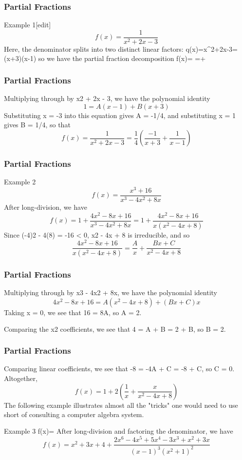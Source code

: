\begin{frame}
\frametitle{Partial Fractions}

Example 1[edit]
\[ f(x)=\frac{1}{x^2+2x-3} \]
Here, the denominator splits into two distinct linear factors:
q(x)=x^2+2x-3=(x+3)(x-1)
so we have the partial fraction decomposition
f(x)= =+
\end{frame}
\begin{frame}
\frametitle{Partial Fractions}
Multiplying through by x2 + 2x - 3, we have the polynomial identity
\[ 1=A(x-1)+B(x+3) \]
Substituting x = -3 into this equation gives A = -1/4, and substituting x = 1 gives B = 1/4, so that
\[f(x) =\frac{1}{x^2+2x-3} =\frac{1}{4}\left(\frac{-1}{x+3}+\frac{1}{x-1}\right) \]
\end{frame}
\begin{frame}
\frametitle{Partial Fractions}

Example 2
\[f(x)=\frac{x^3+16}{x^3-4x^2+8x}\]
After long-division, we have
\[ f(x)=1+\frac{4x^2-8x+16}{x^3-4x^2+8x}=1+\frac{4x^2-8x+16}{x(x^2-4x+8)} \]
Since (-4)2 - 4(8) = -16 < 0, x2 - 4x + 8 is irreducible, and so
\[ \frac{4x^2-8x+16}{x(x^2-4x+8)}=\frac{A}{x}+\frac{Bx+C}{x^2-4x+8} \]
\end{frame}
\begin{frame}
\frametitle{Partial Fractions}
Multiplying through by x3 - 4x2 + 8x, we have the polynomial identity
\[ 4x^2-8x+16 = A(x^2-4x+8)+(Bx+C)x \]
Taking x = 0, we see that 16 = 8A, so A = 2. 

Comparing the x2 coefficients, we see that 4 = A + B = 2 + B, so B = 2. 
\end{frame}
\begin{frame}
\frametitle{Partial Fractions}
Comparing linear coefficients, we see that -8 = -4A + C = -8 + C, so C = 0. Altogether,
\[ f(x)=1+2\left(\frac{1}{x}+\frac{x}{x^2-4x+8}\right)  \]
The following example illustrates almost all the "tricks" one would need to use short of consulting a computer algebra system.
\end{frame}
\begin{frame}
Example 3
f(x)=
After long-division and factoring the denominator, we have
\[ f(x)=x^2+3x+4+\frac{2x^6-4x^5+5x^4-3x^3+x^2+3x}{(x-1)^3(x^2+1)^2} \]

\end{frame}
